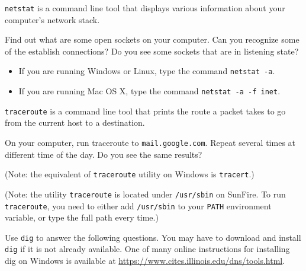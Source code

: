 \documentclass[a4paper,11pt]{exam}
\begin{document}
\begin{questions}

\texttt{netstat} is a command line tool that displays various information about your computer's network stack.

Find out what are some open sockets on your computer.  Can you recognize some of the establish connections?  Do you see some sockets that are in listening state?
\begin{itemize}
\item If you are running Windows or Linux, type the command \texttt{netstat -a}.
\item If you are running Mac OS X, type the command \texttt{netstat -a -f inet}.
\end{itemize}



\texttt{traceroute} is a command line tool that prints the route a packet takes to go from the current host to a destination.

On your computer, run traceroute to \texttt{mail.google.com}.  Repeat several times at different time of the day.  Do you see the same results?

(Note: the equivalent of \texttt{traceroute} utility on Windows is \texttt{tracert}.)

(Note: the utility \texttt{traceroute} is located under \texttt{/usr/sbin} on SunFire.  To run \texttt{traceroute}, you need to either add \texttt{/usr/sbin} to your \texttt{PATH} environment variable, or type the full path every time.)


\label{digq}

Use \texttt{dig} to answer the following questions.  You may have to download and install \texttt{dig} if it is not already available.  One of many online instructions for installing dig on Windows is available at \url{https://www.cites.illinois.edu/dns/tools.html}.

\end{questions}
\end{document}
